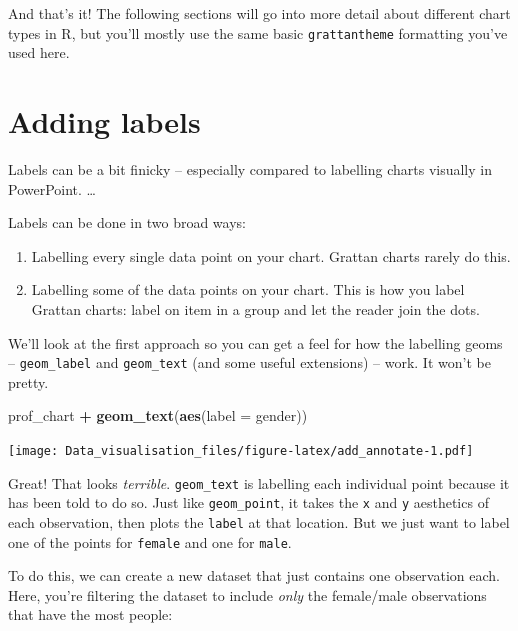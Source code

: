 \documentclass[]{book}
\newenvironment{Shaded}{\begin{snugshade}}{\end{snugshade}}
\newcommand{\DataTypeTok}[1]{\textcolor[rgb]{0.13,0.29,0.53}{#1}}
\newcommand{\KeywordTok}[1]{\textcolor[rgb]{0.13,0.29,0.53}{\textbf{#1}}}
\newcommand{\NormalTok}[1]{#1}
\newcommand{\OperatorTok}[1]{\textcolor[rgb]{0.81,0.36,0.00}{\textbf{#1}}}
\newcommand{\StringTok}[1]{\textcolor[rgb]{0.31,0.60,0.02}{#1}}
\providecommand{\tightlist}{%
  \setlength{\itemsep}{0pt}\setlength{\parskip}{0pt}}
\begin{document}
And that's it! The following sections will go into more detail about different chart types in R, but you'll mostly use the same basic \texttt{grattantheme} formatting you've used here.

\hypertarget{adding-labels}{%
\section{Adding labels}\label{adding-labels}}

Labels can be a bit finicky -- especially compared to labelling charts visually in PowerPoint. \ldots{}

Labels can be done in two broad ways:

\begin{enumerate}
\def\labelenumi{\arabic{enumi}.}
\tightlist
\item
  Labelling every single data point on your chart. Grattan charts rarely do this.
\item
  Labelling some of the data points on your chart. This is how you label Grattan charts: label on item in a group and let the reader join the dots.
\end{enumerate}

We'll look at the first approach so you can get a feel for how the labelling geoms -- \texttt{geom\_label} and \texttt{geom\_text} (and some useful extensions) -- work. It won't be pretty.

\begin{Shaded}
\begin{Highlighting}[]
\NormalTok{prof_chart }\OperatorTok{+}
\StringTok{  }\KeywordTok{geom_text}\NormalTok{(}\KeywordTok{aes}\NormalTok{(}\DataTypeTok{label =}\NormalTok{ gender))}
\end{Highlighting}
\end{Shaded}

\texttt{[image: Data\_visualisation\_files/figure-latex/add\_annotate-1.pdf]}

Great! That looks \emph{terrible}. \texttt{geom\_text} is labelling each individual point because it has been told to do so. Just like \texttt{geom\_point}, it takes the \texttt{x} and \texttt{y} aesthetics of each observation, then plots the \texttt{label} at that location. But we just want to label one of the points for \texttt{female} and one for \texttt{male}.

To do this, we can create a new dataset that just contains one observation each. Here, you're filtering the dataset to include \emph{only} the female/male observations that have the most people:
\end{document}
